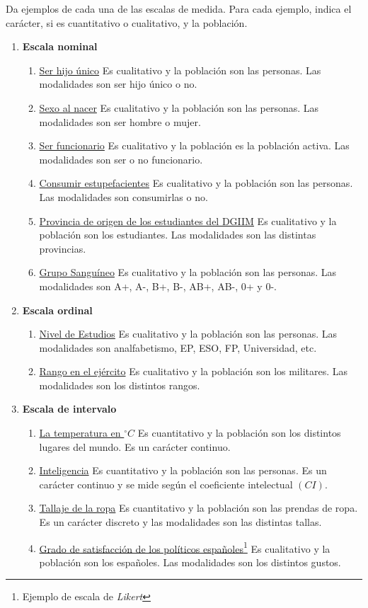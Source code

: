\begin{ejercicio*} Da ejemplos de cada una de las escalas de medida. Para cada ejemplo, indica el carácter, si es cuantitativo o cualitativo, y la población.
\begin{enumerate}

    \item \textbf{Escala nominal}
    \begin{enumerate}
        \item \underline{Ser hijo único} Es cualitativo y la población son las personas. Las modalidades son ser hijo único o no.
        \item \underline{Sexo al nacer} Es cualitativo y la población son las personas. Las modalidades son ser hombre o mujer.
        \item \underline{Ser funcionario} Es cualitativo y la población es la población activa. Las modalidades son ser o no funcionario.
        \item \underline{Consumir estupefacientes} Es cualitativo y la población son las personas. Las modalidades son consumirlas o no.
        \item \underline{Provincia de origen de los estudiantes del DGIIM} Es cualitativo y la población son los estudiantes. Las modalidades son las distintas provincias.
        \item \underline{Grupo Sanguíneo} Es cualitativo y la población son las personas. Las modalidades son A+, A-, B+, B-, AB+, AB-, 0+ y 0-.
    \end{enumerate}

    \item \textbf{Escala ordinal}
    \begin{enumerate}
        \item \underline{Nivel de Estudios} Es cualitativo y la población son las personas. Las modalidades son analfabetismo, EP, ESO, FP, Universidad, etc.
        \item \underline{Rango en el ejército} Es cualitativo y la población son los militares. Las modalidades son los distintos rangos.
    \end{enumerate}

    \item \textbf{Escala de intervalo}
    \begin{enumerate}
        \item \underline{La temperatura en $^\circ C$} Es cuantitativo y la población son los distintos lugares del mundo. Es un carácter continuo.
        \item \underline{Inteligencia} Es cuantitativo y la población son las personas. Es un carácter continuo y se mide según el coeficiente intelectual $(CI)$.
        \item \underline{Tallaje de la ropa} Es cuantitativo y la población son las prendas de ropa. Es un carácter discreto y las modalidades son las distintas tallas.
        \item \underline{Grado de satisfacción de los políticos españoles}\footnote{Ejemplo de escala de \emph{Likert}} Es cualitativo y la población son los españoles. Las modalidades son los distintos gustos.
    \end{enumerate}


\end{enumerate}
\end{ejercicio*}
